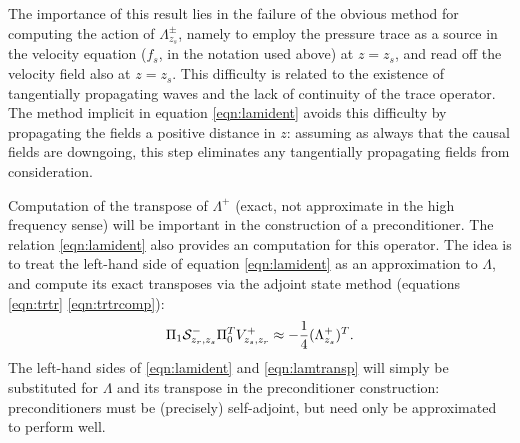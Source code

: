 The importance of this result lies in the failure of the obvious
method for computing the action of $\Lambda^{\pm}_{z_s}$, namely to
employ the pressure trace as a source in the velocity equation ($f_s$,
in the notation used above) at $z=z_s$, and read off the velocity
field also at $z=z_s$. This difficulty is related to the existence of
tangentially propagating waves and the lack of continuity of the trace
operator. The method implicit in equation \ref{eqn:lamident} avoids
this difficulty by propagating the fields a positive distance in $z$:
assuming as always that the causal fields are downgoing, this step
eliminates any tangentially propagating fields from consideration.

Computation of the transpose of $\Lambda^+$ (exact, not approximate in
the high frequency sense) will be important in the
construction of a preconditioner. The relation \ref{eqn:lamident} also
provides an computation for this operator. The idea is to treat the
left-hand side of equation \ref{eqn:lamident} as an approximation to
$\Lambda$, and compute its exact transposes via the adjoint state
method (equations \ref{eqn:trtr} \ref{eqn:trtrcomp}):
\begin{equation}
  \label{eqn:lamtransp}
   \Pi_1 {\cal S}^-_{z_r,z_s}\Pi_0^T V^{+}_{z_s,z_r} \approx -\frac{1}{4}(\Lambda^+_{z_s})^T.
\end{equation} 
The left-hand sides of \ref{eqn:lamident} and \ref{eqn:lamtransp} will
simply be substituted for $\Lambda$ and its transpose in the
preconditioner construction: preconditioners must be (precisely)
self-adjoint, but need only be approximated to perform well.

